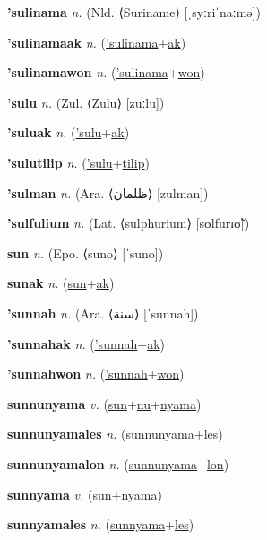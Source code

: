 \textbf{\hypertarget{'sulinama}{'sulinama}} \textit{n.} (Nld. ⟨Suriname⟩ [ˌsyːriˈnaːmə])


\textbf{\hypertarget{'sulinamaak}{'sulinamaak}} \textit{n.} (\hyperlink{'sulinama}{'sulinama}+\allowbreak \hyperlink{ak}{ak})


\textbf{\hypertarget{'sulinamawon}{'sulinamawon}} \textit{n.} (\hyperlink{'sulinama}{'sulinama}+\allowbreak \hyperlink{won}{won})


\textbf{\hypertarget{'sulu}{'sulu}} \textit{n.} (Zul. ⟨Zulu⟩ [zuːlu])


\textbf{\hypertarget{'suluak}{'suluak}} \textit{n.} (\hyperlink{'sulu}{'sulu}+\allowbreak \hyperlink{ak}{ak})


\textbf{\hypertarget{'sulutilip}{'sulutilip}} \textit{n.} (\hyperlink{'sulu}{'sulu}+\allowbreak \hyperlink{tilip}{tilip})


\textbf{\hypertarget{'sulman}{'sulman}} \textit{n.} (Ara. ⟨{\arabics{}ظلمان}⟩ [zulman])


\textbf{\hypertarget{'sulfulium}{'sulfulium}} \textit{n.} (Lat. ⟨sulphurium⟩ [sʊlfurɪʊ̃])


\textbf{\hypertarget{sun}{sun}} \textit{n.} (Epo. ⟨suno⟩ [ˈsuno])


\textbf{\hypertarget{sunak}{sunak}} \textit{n.} (\hyperlink{sun}{sun}+\allowbreak \hyperlink{ak}{ak})


\textbf{\hypertarget{'sunnah}{'sunnah}} \textit{n.} (Ara. ⟨{\arabics{}سنة}⟩ [ˈsunnah])


\textbf{\hypertarget{'sunnahak}{'sunnahak}} \textit{n.} (\hyperlink{'sunnah}{'sunnah}+\allowbreak \hyperlink{ak}{ak})


\textbf{\hypertarget{'sunnahwon}{'sunnahwon}} \textit{n.} (\hyperlink{'sunnah}{'sunnah}+\allowbreak \hyperlink{won}{won})


\textbf{\hypertarget{sunnunyama}{sunnunyama}} \textit{v.} (\hyperlink{sun}{sun}+\allowbreak \hyperlink{nu}{nu}+\allowbreak \hyperlink{nyama}{nyama})


\textbf{\hypertarget{sunnunyamales}{sunnunyamales}} \textit{n.} (\hyperlink{sunnunyama}{sunnunyama}+\allowbreak \hyperlink{les}{les})


\textbf{\hypertarget{sunnunyamalon}{sunnunyamalon}} \textit{n.} (\hyperlink{sunnunyama}{sunnunyama}+\allowbreak \hyperlink{lon}{lon})


\textbf{\hypertarget{sunnyama}{sunnyama}} \textit{v.} (\hyperlink{sun}{sun}+\allowbreak \hyperlink{nyama}{nyama})


\textbf{\hypertarget{sunnyamales}{sunnyamales}} \textit{n.} (\hyperlink{sunnyama}{sunnyama}+\allowbreak \hyperlink{les}{les})


